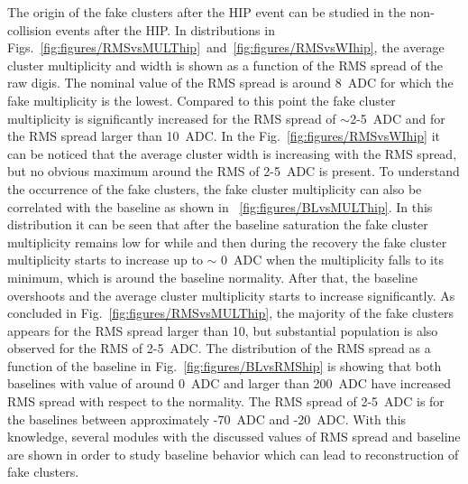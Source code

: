 The origin of the fake clusters after the HIP event can be studied in the non-collision events after the HIP. In distributions in Figs.~\ref{fig:figures/RMSvsMULThip}~and~\ref{fig:figures/RMSvsWIhip}, the average cluster multiplicity and width is shown as a function of the RMS spread of the raw digis. The nominal value of the RMS spread is around 8~ADC for which the fake multiplicity is the lowest. Compared to this point the fake cluster multiplicity is significantly increased for the RMS spread of $\sim$2-5~ADC and for the RMS spread larger than 10~ADC. In the Fig.~\ref{fig:figures/RMSvsWIhip} it can be noticed that the average cluster width is increasing with the RMS spread, but no obvious maximum around the RMS of 2-5~ADC is present. To understand the occurrence of the fake clusters, the fake cluster multiplicity can also be correlated with the baseline as shown in ~\ref{fig:figures/BLvsMULThip}. In this distribution it can be seen that after the baseline saturation the fake cluster multiplicity remains low for while and then during the recovery the fake cluster multiplicity starts to increase up to $\sim$ 0~ADC when the multiplicity falls to its minimum, which is around the baseline normality. After that, the baseline overshoots and the average cluster multiplicity starts to increase significantly. As concluded in Fig.~\ref{fig:figures/RMSvsMULThip}, the majority of the fake clusters appears for the RMS spread larger than 10, but substantial population is also observed for the RMS of 2-5~ADC. The distribution of the RMS spread as a function of the baseline in Fig.~\ref{fig:figures/BLvsRMShip} is showing that both baselines with value of around 0~ADC and larger than 200~ADC have increased RMS spread with respect to the normality. The RMS spread of 2-5~ADC is for the baselines between approximately -70~ADC and -20~ADC. With this knowledge, several modules with the discussed values of RMS spread and baseline are shown in order to study baseline behavior which can lead to reconstruction of fake clusters.


